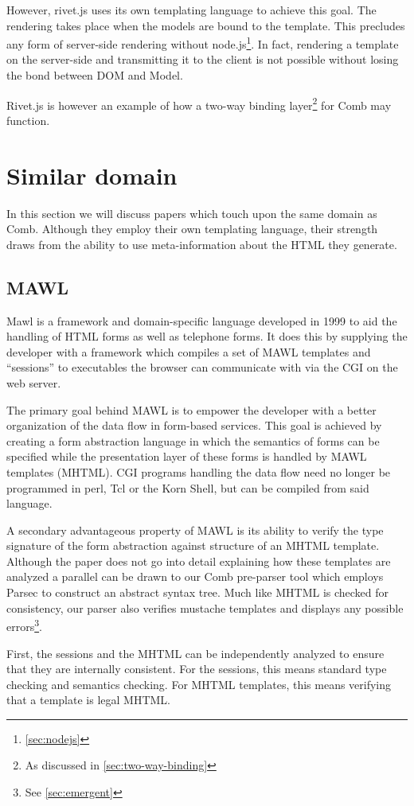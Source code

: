 \documentclass[thesis.tex]{subfiles}
\begin{document}
However, rivet.js uses its own templating language to achieve this goal.
The rendering takes place when the models are bound to the template.
This precludes any form of server-side rendering without node.js\footnote{
\ref{sec:nodejs}}. In fact, rendering a template on the server-side and
transmitting it to the client is not possible without losing the bond between
DOM and Model.

Rivet.js is however an example of how a two-way binding layer\footnote{
As discussed in \ref{sec:two-way-binding}} for Comb may function.



\section{Similar domain}
In this section we will discuss papers which touch upon the same domain as Comb.
Although they employ their own templating language, their strength draws from
the ability to use meta-information about the HTML they generate.

\subsection{MAWL}
Mawl\cite{MAWL} is a framework and domain-specific language developed in 1999
to aid the handling of HTML forms as well as telephone forms.
It does this by supplying the developer with a framework which compiles
a set of MAWL templates and ``sessions'' to executables
the browser can communicate with via the CGI on the web server.

The primary goal behind MAWL is to empower the developer with a better
organization of the data flow in form-based services.
This goal is achieved by creating a form abstraction language in which the
semantics of forms can be specified while the presentation layer of these forms
is handled by MAWL templates (MHTML).
CGI programs handling the data flow need no longer be programmed in
perl, Tcl or the Korn Shell, but can be compiled from said language.

A secondary advantageous property of MAWL is its ability to verify the
type signature of the form abstraction against structure of an MHTML template.
Although the paper does not go into detail explaining how these templates are
analyzed a parallel can be drawn to our Comb pre-parser tool which employs
Parsec to construct an abstract syntax tree. Much like MHTML is checked for
consistency, our parser also verifies mustache templates and displays any
possible errors\footnote{See \ref{sec:emergent}}.
\begin{citequote}{\cite{MAWL}}
First, the sessions and the MHTML can be independently analyzed to ensure that
they are internally consistent.
For the sessions, this means standard type checking and semantics checking.
For MHTML templates, this means verifying that a template is legal MHTML.
\end{citequote}
\end{document}
